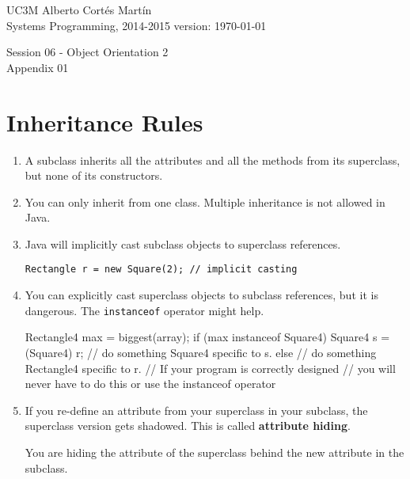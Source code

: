 \documentclass[a4paper, 9pt]{extarticle}
\newcommand{\realtitle}{Session 06 - Object Orientation 2}
\begin{document}
\makebox[\linewidth]{\rule{\textwidth}{0.4pt}}
UC3M \hfill Alberto Cortés Martín\\
Systems Programming, 2014-2015 \hfill version: \today\\
\makebox[\linewidth]{\rule{\textwidth}{0.4pt}}
\begin{center}
  \Large{\realtitle}\\Appendix 01
\end{center}
\makebox[\linewidth]{\rule{\textwidth}{0.4pt}}
\vspace{1cm}


\section{Inheritance Rules}

\begin{enumerate}

  \item A subclass inherits all the attributes and all the methods from its
    superclass, but none of its constructors.

  \item You can only inherit from one class. Multiple inheritance is not
    allowed in Java.

  \item Java will implicitly cast subclass objects to superclass references.

\verb+Rectangle r = new Square(2); // implicit casting+

  \item You can explicitly cast superclass objects to subclass references, but
    it is dangerous. The \verb+instanceof+ operator might help.

\begin{blackboard}
Rectangle4 max = biggest(array);
if (max instanceof Square4) {
  Square4 s = (Square4) r;
  // do something Square4 specific to s.
} else {
  // do something Rectangle4 specific to r.
}
// If your program is correctly designed
// you will never have to do this or use the instanceof operator
\end{blackboard}

  \item If you re-define an attribute from your superclass in your subclass,
    the superclass version gets shadowed. This is called \textbf{attribute hiding}.

    You are hiding the attribute of the
    superclass behind the new attribute in the subclass.


\end{enumerate}
\end{document}
